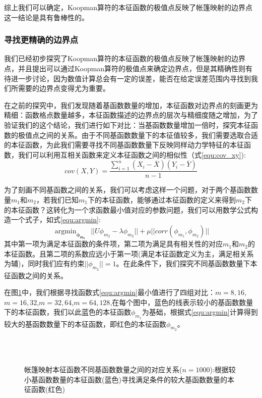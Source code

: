 综上我们可以确定，Koopman算符的本征函数的极值点反映了帐篷映射的边界点这一结论是具有鲁棒性的。

\subsubsection{寻找更精确的边界点}
我们已经初步探究了Koopman算符的本征函数的极值点反映了帐篷映射的边界点，并且提出可以通过Koopman算符的极值点来确定边界点，但是其精确性则有待进一步讨论，因为数值计算总会有一定的误差，能否在给定误差范围内寻找到我们所需要的边界点变得尤为重要。

在之前的探究中，我们发现随着基函数数量的增加，本征函数对边界点的刻画更为精细：函数格点数量越多，本征函数描述的边界点的层次与精细度随之增加，为了验证我们的这个结论，我们进行如下对比：当基函数数量增加一倍时，探究本征函数的极值点之间的关系。由于不同基函数数量下的本征值较多，我们需要选取合适的本征函数，为此我们需要寻找不同基函数数量下反映同样动力学特征的本征函数，我们可以利用互相关函数\cite{gailulun2008}来定义本征函数之间的相似性（式\ref{equ:cov_xy}):
\begin{equation}
  cov(X,Y)=\dfrac{\sum_{i=1}^{n}(X_i-\overline{X})(Y_i-\overline{Y})}{n-1}
  \label{equ:cov_xy}
\end{equation}

为了刻画不同基函数之间的关系，我们可以考虑这样一个问题，对于两个基函数数量$m_1$和$m_2$，若我们已知$m_1$下的本征函数，能够通过本征函数的定义来得到$m_2$下的本征函数？这转化为一个求函数最小值对应的参数问题，我们可以用数学公式构造一个式子，如式\ref{equ:argmin}:
\begin{equation}
  \mathop{\arg\min}_{\boldsymbol{\phi_{m_2}}} \ \ || U\phi_{m_2}-\lambda \phi_{m_2} || + \mu ||corr(\phi_{m_1},\phi_{m_2})||
  \label{equ:argmin}
\end{equation}
其中第一项为满足本征函数的条件项，第二项为满足具有相关性的对应$m_1$和$m_2$的本征函数。且第二项的系数应远小于第一项(满足本征函数定义为主，满足相关系为辅)，同时我们应有约束$||\phi_{m_2}||=1$。在此条件下，我们探究不同基函数数量下本征函数之间的关系。

在图\ref{fig:Tent_findeigen_m8m16}中，我们根据寻找函数式\ref{equ:argmin}最小值进行了四组对比：$m=8,16$,$m=16,32$,$m=32,64$,$m=64,128$,在每个图中，蓝色的线表示较小的基函数数量下的本征函数，我们以此蓝色的本征函数$\phi_{m_1}$为基础，根据式\ref{equ:argmin}计算得到较大的基函数数量下的本征函数，即红色的本征函数$\phi_{m_2}$。

\begin{figure}[!]
  \centering
    \\
    \\
  \caption[帐篷映射本征函数不同基函数数量之间的对应关系]{帐篷映射本征函数不同基函数数量之间的对应关系($n=1000$):根据较小基函数数量的本征函数(蓝色)寻找满足条件的较大基函数数量的本征函数(红色)}\label{fig:Tent_findeigen_m8m16}
\end{figure}

